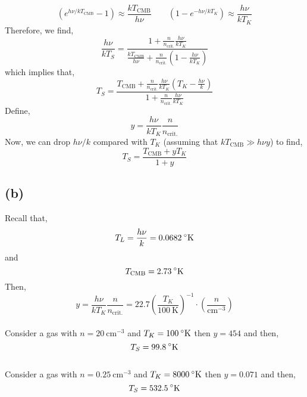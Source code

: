 \documentclass[12pt]{article}
\begin{document}
\[ (e^{h \nu/ k T_{\text{CMB}}} - 1) \approx \frac{k T_{\text{CMB}}}{h \nu} \quad \quad (1 - e^{-h\nu/k T_K}) \approx \frac{h \nu}{k T_K} \]
Therefore, we find,
\[ \frac{h \nu}{k T_S} = \frac{1 + \frac{n}{n_{\text{crit}.}} \frac{h \nu}{k T_K}}{\frac{k T_{\text{CMB}}}{h \nu} + \frac{n}{n_{\text{crit}.}} \left( 1 - \frac{h \nu}{k T_K} \right)} \]
which implies that,
\[ T_S = \frac{T_{\text{CMB}} + \frac{n}{n_{\text{crit}.}} \frac{h \nu}{k T_K} \left(T_K - \frac{h \nu}{k} \right)}{1 + \frac{n}{n_{\text{crit}.}} \frac{h \nu}{k T_K}} \]
Define,
\[ y = \frac{h \nu}{k T_K} \frac{n}{n_{\text{crit.}}} \]
Now, we can drop $h \nu / k$ compared with $T_K$ (assuming that $k T_{\text{CMB}}  \gg h \nu y$) to find,
\[ T_S = \frac{T_{\text{CMB}} + y T_K}{1 + y} \] 

\subsection*{(b)}

Recall that,
\[ T_L = \frac{h \nu}{k} = 0.0682 \: ^\circ\mathrm{K} \]
and
\[ T_{\text{CMB}} = 2.73 \: ^\circ\mathrm{K} \]
Then,
\[ y = \frac{h \nu}{k T_K} \frac{n}{n_{\text{crit.}}} = 22.7 \left( \frac{T_K}{100 \: \text{K}} \right)^{-1} \cdot \left( \frac{n}{\text{cm}^{-3}} \right) \]
\bigskip\\
Consider a gas with $n = 20 \: \text{cm}^{-3}$ and $T_K = 100 \: ^\circ\mathrm{K}$ then $y = 454$ and then,
\[ T_S = 99.8 \: ^\circ\mathrm{K} \]
\bigskip\\
Consider a gas with $n = 0.25 \: \text{cm}^{-3}$ and $T_K = 8000 \: ^\circ\mathrm{K}$ then $y = 0.071$ and then,
\[ T_S = 532.5 \: ^\circ\mathrm{K} \]
\end{document}
